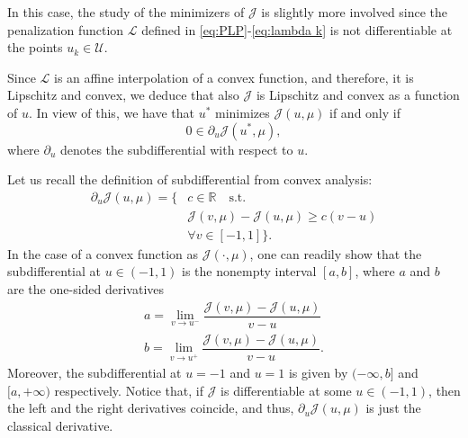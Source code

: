 \documentclass[twocolumn]{autart}    %
\begin{document}
In this case, the study of the minimizers of $\mathcal{J}$ is slightly more involved since the penalization function $\mathcal{L}$ defined in \eqref{eq:PLP}-\eqref{eq:lambda k} is not differentiable at the points $u_k\in\mathcal U$.

Since $\mathcal{L}$ is an affine interpolation of a convex function, and therefore, it is Lipschitz and convex, we deduce that also $\mathcal{J}$ is Lipschitz and convex as a function of $u$. In view of this, we have that $u^\ast$ minimizes $\mathcal{J} (u,\mu)$ if and only if
\begin{equation}\label{opti cond subdiff}
	0\in \partial_u \mathcal{J} (u^\ast,\mu),
\end{equation}
where $\partial_u$ denotes the subdifferential with respect to $u$. 

Let us recall the definition of subdifferential from convex analysis:
\begin{align*}
	\partial_u \mathcal{J} (u,\mu) = \{  & c\in \mathbb{R} \quad \text{s.t.} 
	\\
	&\mathcal{J} (v,\mu) - \mathcal{J} (u,\mu) \geq c(v-u) 
	\\
	& \forall v\in [-1,1] \}. 
\end{align*}
In the case of a convex function as $\mathcal{J}(\cdot, \mu)$, one can readily show that the subdifferential at $u\in (-1,1)$ is the nonempty interval $[a,b]$, where $a$ and $b$ are the one-sided derivatives
\begin{equation*}%
\begin{array}{l}
	a = \displaystyle\lim_{v\to u^-} \dfrac{\mathcal{J} (v,\mu) - \mathcal{J}(u,\mu)}{v-u} 
	\\[5pt]
	b = \displaystyle\lim_{v\to u^+} \dfrac{\mathcal{J} (v,\mu) - \mathcal{J}(u,\mu)}{v-u}. 
	\end{array}
\end{equation*}
Moreover, the subdifferential at $u=-1$ and $u=1$ is given by $(-\infty, b]$ and $[a,+\infty)$ respectively.
Notice that, if $\mathcal J$ is differentiable at some $u\in (-1,1)$, then the left and the right derivatives coincide, and thus, $\partial_u \mathcal{J}(u,\mu)$ is just the classical derivative.

\end{document}
